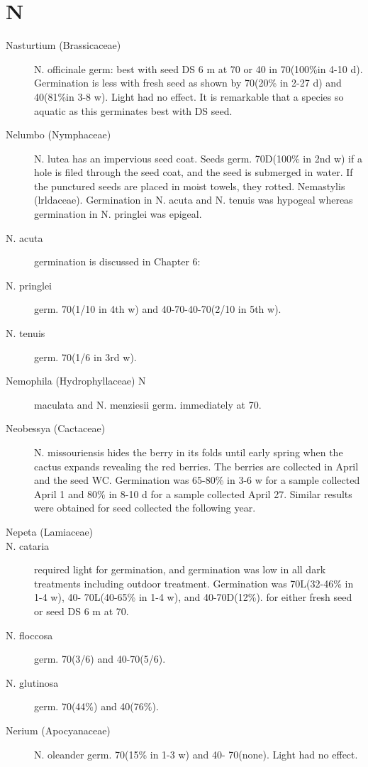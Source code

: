 \section{N}
\begin{description}

\item[Nasturtium (Brassicaceae)] N. officinale germ: best with seed DS 6 m at
70 or 40 in 70(100\%in 4-10 d). Germination is less with fresh seed as shown by
70(20\% in 2-27 d) and 40(81\%in 3-8 w). Light had no effect. It is remarkable that a
species so aquatic as this germinates best with DS seed.

\item[Nelumbo (Nymphaceae)] N. lutea has an impervious seed coat. Seeds
germ. 70D(100\% in 2nd w) if a hole is filed through the seed coat, and the seed is
submerged in water. If the punctured seeds are placed in moist towels, they rotted.
Nemastylis (lrldaceae). Germination in N. acuta and N. tenuis was
hypogeal whereas germination in N. pringlei was epigeal.
\item[N. acuta] germination is discussed in Chapter 6:
\item[N. pringlei] germ. 70(1/10 in 4th w) and 40-70-40-70(2/10 in 5th w).
\item[N. tenuis] germ. 70(1/6 in 3rd w).
\item[Nemophila (Hydrophyllaceae) N] maculata and N. menziesii germ.
immediately at 70.
\item[Neobessya (Cactaceae)] N. missouriensis hides the berry in its folds until
early spring when the cactus expands revealing the red berries. The berries are
collected in April and the seed WC. Germination was 65-80\% in 3-6 w for a sample
collected April 1 and 80\% in 8-10 d for a sample collected April 27. Similar results
were obtained for seed collected the following year.
\item[Nepeta (Lamiaceae)]
\item[N. cataria] required light for germination, and germination was low in all dark
treatments including outdoor treatment. Germination was 70L(32-46\% in 1-4 w), 40-
70L(40-65\% in 1-4 w), and 40-70D(12\%). for either fresh seed or seed DS 6 m at 70.
\item[N. floccosa] germ. 70(3/6) and 40-70(5/6).
\item[N. glutinosa] germ. 70(44\%) and 40(76\%).
\item[Nerium (Apocyanaceae)] N. oleander germ. 70(15\% in 1-3 w) and 40-
70(none). Light had no effect.


\end{description}
